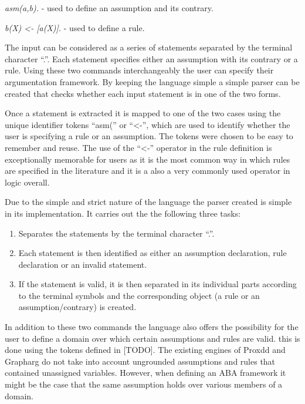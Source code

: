 \begin{itemize*}
\item \emph{asm(a,b).} - used to define an assumption and its contrary.
\item \emph{b(X) \textless- [a(X)].} -  used to define a rule.
\end{itemize*}

The input can be considered as a series of statements separated by the terminal character ``.''. Each statement specifies either an assumption with its contrary or a rule. Using these two commands interchangeably  the user can specify their argumentation framework. By keeping the language simple a simple parser can be created that checks whether each input statement is in one of the two forms.

Once a statement is extracted it is mapped to one of the two cases using the unique identifier tokens ``asm('' or ``<-'', which are used to identify whether the user is specifying a rule or an assumption. The tokens were chosen to be easy to remember and reuse. The use of the ``<-'' operator in the rule definition is exceptionally memorable for users as it is the most common way in which rules are specified in the literature and it is a also a very commonly used operator in logic overall.

Due to the simple and strict nature of the language the parser created is simple in its implementation. It carries out the the following three tasks:

\begin{enumerate}
\item Separates the statements by the terminal character ``.''.
\item Each statement is then identified as either an assumption declaration, rule declaration or an invalid statement.
\item If the statement is valid, it is then separated in its individual parts according to the terminal symbols and the corresponding object (a rule or an assumption/contrary) is created.
\end{enumerate}

In addition to these two commands the language also offers the possibility for the user to define a domain over which certain assumptions and rules are valid. this is done using the tokens defined in [TODO]. The existing engines of Proxdd and Grapharg do not take into account ungrounded assumptions and rules that contained unassigned variables. However, when defining an ABA framework it might be the case that the same assumption holds over various members of a domain.

